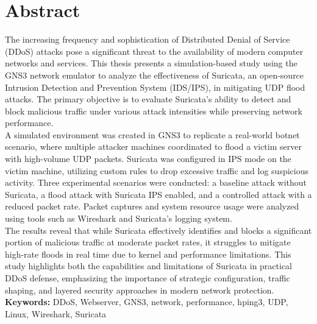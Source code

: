 \chapter*{Abstract}
The increasing frequency and sophistication of Distributed Denial of Service (DDoS) attacks pose a significant threat to the availability of modern computer networks and services. This thesis presents a simulation-based study using the GNS3 network emulator to analyze the effectiveness of Suricata, an open-source Intrusion Detection and Prevention System (IDS/IPS), in mitigating UDP flood attacks. The primary objective is to evaluate Suricata's ability to detect and block malicious traffic under various attack intensities while preserving network performance.
\\
A simulated environment was created in GNS3 to replicate a real-world botnet scenario, where multiple attacker machines coordinated to flood a victim server with high-volume UDP packets. Suricata was configured in IPS mode on the victim machine, utilizing custom rules to drop excessive traffic and log suspicious activity. Three experimental scenarios were conducted: a baseline attack without Suricata, a flood attack with Suricata IPS enabled, and a controlled attack with a reduced packet rate. Packet captures and system resource usage were analyzed using tools such as Wireshark and Suricata’s logging system.
\\
The results reveal that while Suricata effectively identifies and blocks a significant portion of malicious traffic at moderate packet rates, it struggles to mitigate high-rate floods in real time due to kernel and performance limitations. This study highlights both the capabilities and limitations of Suricata in practical DDoS defense, emphasizing the importance of strategic configuration, traffic shaping, and layered security approaches in modern network protection.
\\
\textbf{Keywords:} DDoS, Webserver, GNS3, network, performance, hping3, UDP, Linux, Wireshark, Suricata